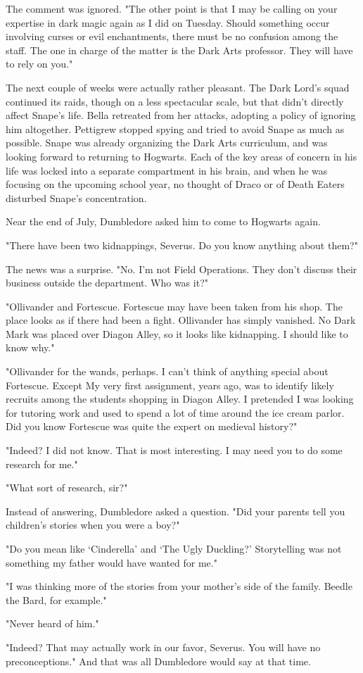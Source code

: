The comment was ignored. "The other point is that I may be calling on your expertise in dark magic again as I did on Tuesday. Should something occur involving curses or evil enchantments, there must be no confusion among the staff. The one in charge of the matter is the Dark Arts professor. They will have to rely on you."

The next couple of weeks were actually rather pleasant. The Dark Lord's squad continued its raids, though on a less spectacular scale, but that didn't directly affect Snape's life. Bella retreated from her attacks, adopting a policy of ignoring him altogether. Pettigrew stopped spying and tried to avoid Snape as much as possible. Snape was already organizing the Dark Arts curriculum, and was looking forward to returning to Hogwarts. Each of the key areas of concern in his life was locked into a separate compartment in his brain, and when he was focusing on the upcoming school year, no thought of Draco or of Death Eaters disturbed Snape's concentration.

Near the end of July, Dumbledore asked him to come to Hogwarts again.

"There have been two kidnappings, Severus. Do you know anything about them?"

The news was a surprise. "No. I'm not Field Operations. They don't discuss their business outside the department. Who was it?"

"Ollivander and Fortescue. Fortescue may have been taken from his shop. The place looks as if there had been a fight. Ollivander has simply vanished. No Dark Mark was placed over Diagon Alley, so it looks like kidnapping. I should like to know why."

"Ollivander for the wands, perhaps. I can't think of anything special about Fortescue. Except{\el} My very first assignment, years ago, was to identify likely recruits among the students shopping in Diagon Alley. I pretended I was looking for tutoring work and used to spend a lot of time around the ice cream parlor. Did you know Fortescue was quite the expert on medieval history?"

"Indeed? I did not know. That is most interesting. I may need you to do some research for me."

"What sort of research, sir?"

Instead of answering, Dumbledore asked a question. "Did your parents tell you children's stories when you were a boy?"

"Do you mean like `Cinderella' and `The Ugly Duckling?' Storytelling was not something my father would have wanted for me."

"I was thinking more of the stories from your mother's side of the family. Beedle the Bard, for example."

"Never heard of him."

"Indeed? That may actually work in our favor, Severus. You will have no preconceptions." And that was all Dumbledore would say at that time. 


